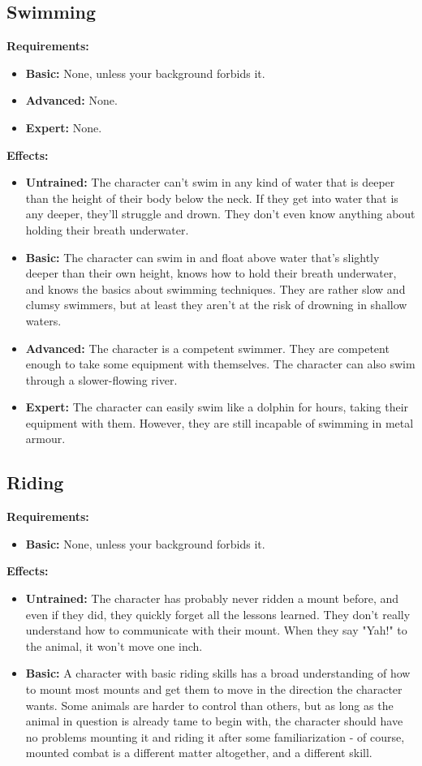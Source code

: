 \documentclass[openany,10pt,a4paper]{book}
\begin{document}
\subsection{Swimming}
\textbf{Requirements:}
\begin{itemize}
	\item \textbf{Basic:} None, unless your background forbids it.
	\item \textbf{Advanced:} None.
	\item \textbf{Expert:} None.
\end{itemize}
\textbf{Effects:}
\begin{itemize}
	\item \textbf{Untrained:} The character can't swim in any kind of water that is deeper than the height of their body below the neck. If they get into water that is any deeper, they'll struggle and drown. They don't even know anything about holding their breath underwater.
	\item \textbf{Basic:} The character can swim in and float above water that's slightly deeper than their own height, knows how to hold their breath underwater, and knows the basics about swimming techniques. They are rather slow and clumsy swimmers, but at least they aren't at the risk of drowning in shallow waters.
	\item \textbf{Advanced:} The character is a competent swimmer. They are competent enough to take some equipment with themselves. The character can also swim through a slower-flowing river.
	\item \textbf{Expert:} The character can easily swim like a dolphin for hours, taking their equipment with them. However, they are still incapable of swimming in metal armour.
\end{itemize}\newpage
\subsection{Riding}
\textbf{Requirements:}
\begin{itemize}
	\item \textbf{Basic:} None, unless your background forbids it.
\end{itemize}
\textbf{Effects:}
\begin{itemize}
	\item \textbf{Untrained:} The character has probably never ridden a mount before, and even if they did, they quickly forget all the lessons learned. They don't really understand how to communicate with their mount. When they say "Yah!" to the animal, it won't move one inch. 
	\item \textbf{Basic:} A character with basic riding skills has a broad understanding of how to mount most mounts and get them to move in the direction the character wants. Some animals are harder to control than others, but as long as the animal in question is already tame to begin with, the character should have no problems mounting it and riding it after some familiarization - of course, mounted combat is a different matter altogether, and a different skill.
\end{itemize}
\end{document}
